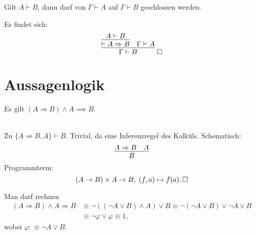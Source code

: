 \begin{Satz}\newlinefirst
Gilt $A\vdash B$, dann darf von $\Gamma\vdash A$ auf $\Gamma\vdash B$
geschlossen werden.
\end{Satz}
\begin{Beweis} Es findet sich:
\[\infer{\Gamma\vdash B}{
  \infer{\vdash A\Rightarrow B}{A\vdash B}
  & \Gamma\vdash A}\;\qedsymbol\]
\end{Beweis}

\newpage
\section{Aussagenlogik}

\begin{Satz}
Es gilt $(A\Rightarrow B)\land A \implies B$.
\end{Satz}
\begin{Beweis}\\
Zu $\{A\Rightarrow B, A\}\vdash B$. Trivial, da eine Inferenzregel des Kalküls. Schematisch:
\[\infer{B}{A\Rightarrow B & A}\]
Programmterm:
\[(A\to B)\times A\to B,\; (f, a)\mapsto f(a).\,\square\]
\end{Beweis}

\begin{Beweis}
Man darf rechnen
\begin{align*}
(A\Rightarrow B)\land A \Rightarrow B &\equiv
\neg ((\neg A\lor B)\land A) \lor B
\equiv\neg (\neg A\lor B) \lor \neg A \lor B\\
&\equiv \neg\varphi\lor\varphi\equiv 1,
\end{align*}
wobei $\varphi :\equiv \neg A\lor B$.\;\qedsymbol
\end{Beweis}

